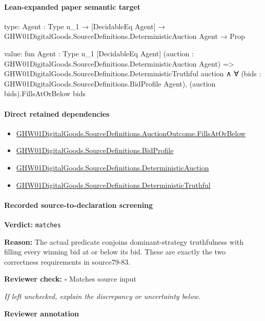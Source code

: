 \documentclass[10pt]{article}
\newcommand{\reviewerbox}{%
  \par\noindent\fbox{\parbox{0.96\linewidth}{\rule{0pt}{0.38in}}}\par
}
\newcommand{\reviewmatch}[1]{%
  \par\noindent\textbf{Reviewer check:} $\square$\; #1\par
  \noindent\emph{If left unchecked, explain the discrepancy or uncertainty below.}\par
}
\begin{document}
\paragraph{Lean-expanded paper semantic target}
\begin{ReviewVerbatim}
type:
{Agent : Type u_1} → [DecidableEq Agent] → GHW01DigitalGoods.SourceDefinitions.DeterministicAuction Agent → Prop

value:
fun {Agent : Type u_1} [DecidableEq Agent] (auction : GHW01DigitalGoods.SourceDefinitions.DeterministicAuction Agent) =>
  GHW01DigitalGoods.SourceDefinitions.DeterministicTruthful auction ∧
    ∀ (bids : GHW01DigitalGoods.SourceDefinitions.BidProfile Agent), (auction bids).FillsAtOrBelow bids
\end{ReviewVerbatim}

\paragraph{Direct retained dependencies}
\begin{itemize}\raggedright
\item \hyperlink{paper-prerequisite-babf36338c3fb190}{GHW01\allowbreak{}Digital\allowbreak{}Goods.\allowbreak{}Source\allowbreak{}Definitions.\allowbreak{}Auction\allowbreak{}Outcome.\allowbreak{}Fills\allowbreak{}At\allowbreak{}Or\allowbreak{}Below}
\item \hyperlink{paper-prerequisite-ac8769d0dccf04f4}{GHW01\allowbreak{}Digital\allowbreak{}Goods.\allowbreak{}Source\allowbreak{}Definitions.\allowbreak{}Bid\allowbreak{}Profile}
\item \hyperlink{paper-prerequisite-71190db14f40c12d}{GHW01\allowbreak{}Digital\allowbreak{}Goods.\allowbreak{}Source\allowbreak{}Definitions.\allowbreak{}Deterministic\allowbreak{}Auction}
\item \hyperlink{paper-prerequisite-6cf13e2e3e177e22}{GHW01\allowbreak{}Digital\allowbreak{}Goods.\allowbreak{}Source\allowbreak{}Definitions.\allowbreak{}Deterministic\allowbreak{}Truthful}
\end{itemize}
\paragraph{Recorded source-to-declaration screening}
\textbf{Verdict:} \texttt{matches}
\\
{\raggedright
\textbf{Reason:} The actual predicate conjoins dominant-\allowbreak{}strategy truthfulness with filling every winning bid at or below its bid.\allowbreak{} These are exactly the two correctness requirements in source79-\allowbreak{}83.\allowbreak{}
\par}
\reviewmatch{Matches source input}
\noindent\textbf{Reviewer annotation}\par
\reviewerbox
\clearpage
\hypertarget{paper-prerequisite-18f5ca1078541ee1}{}
\end{document}
